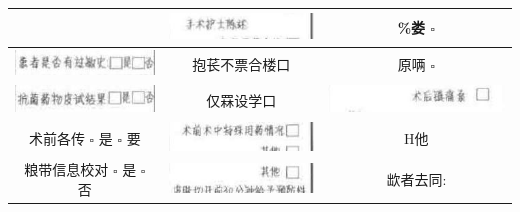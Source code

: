 \documentclass[10pt]{article}
\begin{document}
\begin{center}
\begin{tabular}{|c|c|c|}
 & \includegraphics[max width=\textwidth]{2024_07_05_645bb794a4d4f32ee0c8g-080(16)}
 & \%娄 $\square$ \\
\hline
\includegraphics[max width=\textwidth]{2024_07_05_645bb794a4d4f32ee0c8g-080(24)}
 & 抱苌不票合楼口 & 原唡 $\square$ \\
\hline
\includegraphics[max width=\textwidth]{2024_07_05_645bb794a4d4f32ee0c8g-080(3)}
 & 仅罧设学口 & \includegraphics[max width=\textwidth]{2024_07_05_645bb794a4d4f32ee0c8g-080(8)}
 \\
\hline
术前各传 $\square$ 是 $\square$ 要 & \includegraphics[max width=\textwidth]{2024_07_05_645bb794a4d4f32ee0c8g-080(11)}
 & H他 \\
\hline
粮带信息校对 $\square$ 是 $\square$ 否 & \includegraphics[max width=\textwidth]{2024_07_05_645bb794a4d4f32ee0c8g-080(17)}
 & 欪者去同: \\

\end{tabular}
\end{center}
\end{document}
